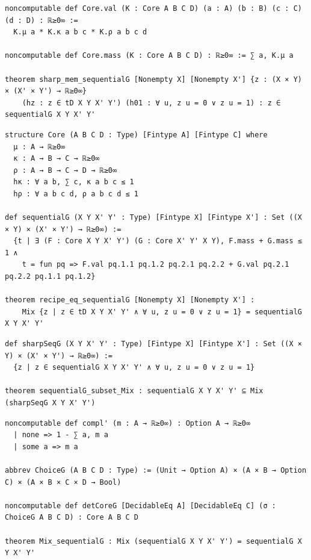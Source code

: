 \label{lean:sharp-mem-sequentialg}
\begin{lstlisting}
noncomputable def Core.val (K : Core A B C D) (a : A) (b : B) (c : C) (d : D) : ℝ≥0∞ :=
  K.μ a * K.κ a b c * K.ρ a b c d

noncomputable def Core.mass (K : Core A B C D) : ℝ≥0∞ := ∑ a, K.μ a

theorem sharp_mem_sequentialG [Nonempty X] [Nonempty X'] {z : (X × Y) × (X' × Y') → ℝ≥0∞}
    (hz : z ∈ tD X Y X' Y') (h01 : ∀ u, z u = 0 ∨ z u = 1) : z ∈ sequentialG X Y X' Y'
\end{lstlisting}

\label{lean:recipe-eq-sequentialg}
\begin{lstlisting}
structure Core (A B C D : Type) [Fintype A] [Fintype C] where
  μ : A → ℝ≥0∞
  κ : A → B → C → ℝ≥0∞
  ρ : A → B → C → D → ℝ≥0∞
  hκ : ∀ a b, ∑ c, κ a b c ≤ 1
  hρ : ∀ a b c d, ρ a b c d ≤ 1

def sequentialG (X Y X' Y' : Type) [Fintype X] [Fintype X'] : Set ((X × Y) × (X' × Y') → ℝ≥0∞) :=
  {t | ∃ (F : Core X Y X' Y') (G : Core X' Y' X Y), F.mass + G.mass ≤ 1 ∧
    t = fun pq => F.val pq.1.1 pq.1.2 pq.2.1 pq.2.2 + G.val pq.2.1 pq.2.2 pq.1.1 pq.1.2}

theorem recipe_eq_sequentialG [Nonempty X] [Nonempty X'] :
    Mix {z | z ∈ tD X Y X' Y' ∧ ∀ u, z u = 0 ∨ z u = 1} = sequentialG X Y X' Y'
\end{lstlisting}

\label{lean:sequentialg-subset-mix}
\begin{lstlisting}
def sharpSeqG (X Y X' Y' : Type) [Fintype X] [Fintype X'] : Set ((X × Y) × (X' × Y') → ℝ≥0∞) :=
  {z | z ∈ sequentialG X Y X' Y' ∧ ∀ u, z u = 0 ∨ z u = 1}

theorem sequentialG_subset_Mix : sequentialG X Y X' Y' ⊆ Mix (sharpSeqG X Y X' Y')
\end{lstlisting}

\label{lean:mix-sequentialg}
\begin{lstlisting}
noncomputable def compl' (m : A → ℝ≥0∞) : Option A → ℝ≥0∞
  | none => 1 - ∑ a, m a
  | some a => m a

abbrev ChoiceG (A B C D : Type) := (Unit → Option A) × (A × B → Option C) × (A × B × C × D → Bool)

noncomputable def detCoreG [DecidableEq A] [DecidableEq C] (σ : ChoiceG A B C D) : Core A B C D

theorem Mix_sequentialG : Mix (sequentialG X Y X' Y') = sequentialG X Y X' Y'
\end{lstlisting}

